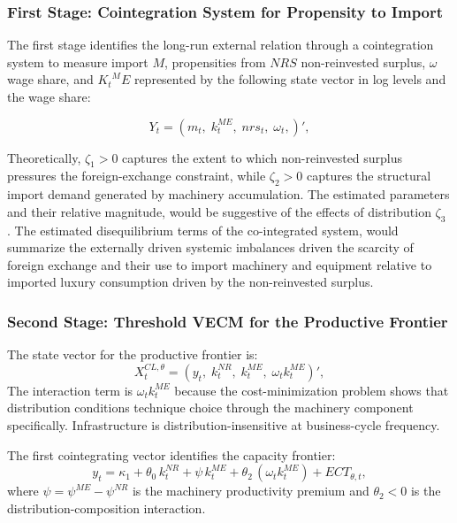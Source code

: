 \subsubsection{First Stage: Cointegration System for Propensity to Import}
\label{subsec:chile_imports}

The first stage identifies the long-run external relation through a
cointegration system to measure import $M$, propensities from $NRS$ non-reinvested surplus, $\omega$ wage share, and ${K_t}^ME$ represented by the following state vector in log levels and the wage share:

\begin{equation}
	Y_t
	=
	\left(
	m_t,\;
	k_t^{ME},\;
	nrs_t,\;
	\omega_t,
	\right)',
	\label{eq:cl:state_vector_theta}
\end{equation}


Theoretically, $\zeta_1 > 0$ captures the extent to which
non-reinvested surplus pressures the foreign-exchange constraint, while
$\zeta_2 > 0$ captures the structural import demand generated by
machinery accumulation. The estimated parameters and their relative magnitude, 
would be suggestive of the effects of distribution $\zeta_3$ \citep{Kaldor1959}. 
The estimated disequilibrium terms of the co-integrated system, would 
summarize the externally driven systemic imbalances driven the scarcity 
of foreign exchange and their use to import machinery and equipment 
relative to imported luxury consumption driven by the non-reinvested surplus.  

\subsubsection{Second Stage: Threshold VECM for the Productive Frontier}
\label{subsec:chile_frontier_threshold}

The state vector for the productive frontier is:
%
\begin{equation}
	X_t^{CL,\theta}
	=
	\left(
	y_t,\;
	k_t^{NR},\;
	k_t^{ME},\;
	\omega_t k_t^{ME}
	\right)',
	\label{eq:cl:state_vector_theta}
\end{equation}
%
The interaction term is $\omega_t k_t^{ME}$ because the
cost-minimization problem shows that distribution conditions technique
choice through the machinery component specifically. Infrastructure is
distribution-insensitive at business-cycle frequency.

The first cointegrating vector identifies the capacity frontier:
%
\begin{equation}
	y_t
	=
	\kappa_1
	+
	\theta_0\, k_t^{NR}
	+
	\psi\, k_t^{ME}
	+
	\theta_2\,(\omega_t k_t^{ME})
	+
	ECT_{\theta,t},
	\label{eq:cl:cv1}
\end{equation}
%
where $\psi = \psi^{ME}-\psi^{NR}$ is the machinery
productivity premium and $\theta_2 < 0$ is the
distribution-composition interaction.

